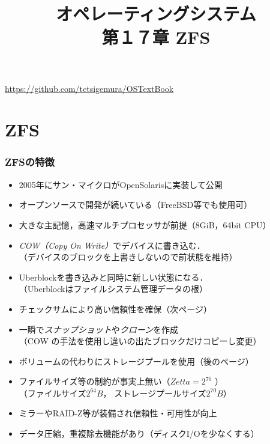 \documentclass[unicode,handout]{beamer}                   %
\begin{document}
\title[ZFS]
      {オペレーティングシステム\\第１７章 ZFS}
\date{}
\begin{frame}
  \titlepage
  \centerline{\url{https://github.com/tctsigemura/OSTextBook}}
\end{frame}


\section{ZFS}
\begin{frame}
  \frametitle{ZFSの特徴}
  \begin{itemize}
  \item 2005年にサン・マイクロがOpenSolarisに実装して公開
  \item オープンソースで開発が続いている（FreeBSD等でも使用可）
  \item 大きな主記憶，高速マルチプロセッサが前提（8GiB，64bit CPU）
  \item \emph{COW（Copy On Write）}でデバイスに書き込む．\\
    （デバイスのブロックを上書きしないので前状態を維持）
  \item Uberblockを書き込みと同時に新しい状態になる．\\
    （Uberblockはファイルシステム管理データの根）
  \item チェックサムにより高い信頼性を確保（次ページ）
  \item 一瞬で\emph{スナップショット}や\emph{クローン}を作成 \\
    （COW の手法を使用し違いの出たブロックだけコピーし変更）
  \item ボリュームの代わりにストレージプールを使用（後のページ）
  \item ファイルサイズ等の制約が事実上無い（$Zetta = 2^{70}$ ）\\
    （ファイルサイズ$2^{64}B$， ストレージプールサイズ$2^{70}B$）
  \item ミラーやRAID-Z等が装備され信頼性・可用性が向上
  \item データ圧縮，重複除去機能があり（ディスクI/Oを少なくする）
  \end{itemize}
  \vfill
\end{frame}
\end{document}
